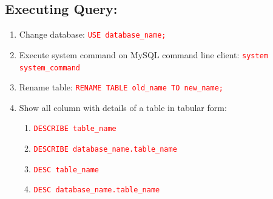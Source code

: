 \documentclass[12 pt, letterpaper]{extarticle}
\newcommand{\R}{\textcolor{red}} %
\newcommand{\T}{\texttt}
\begin{document}
\subsection*{Executing Query: }
\begin{enumerate}
	\item Change database: \R{\T{USE database\_name;}}
	\item Execute system command on MySQL command line client: \R{\T{system system\_command}}
	\item Rename table: \R{\T{RENAME TABLE old\_name TO new\_name;}}
	\item Show all column with details of a table in tabular form:
	      \begin{enumerate}
		      \item \R{\T{DESCRIBE table\_name}}
		      \item \R{\T{DESCRIBE database\_name.table\_name}}
		      \item \R{\T{DESC table\_name}}
		      \item \R{\T{DESC database\_name.table\_name}}
	      \end{enumerate}
\end{enumerate}
\end{document}
